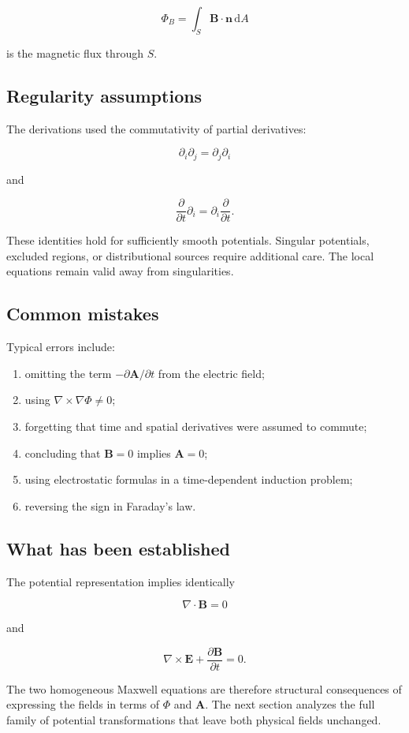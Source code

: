 \[
\Phi_B
=
\int_S
\mathbf{B}\cdot\mathbf{n}
\,\mathrm{d}A
\]

is the magnetic flux through \(S\).

\subsection{Regularity assumptions}

The derivations used the commutativity of partial derivatives:

\[
\partial_i\partial_j
=
\partial_j\partial_i
\]

and

\[
\frac{\partial}{\partial t}
\partial_i
=
\partial_i
\frac{\partial}{\partial t}.
\]

These identities hold for sufficiently smooth potentials. Singular potentials, excluded regions, or distributional sources require additional care. The local equations remain valid away from singularities.

\subsection{Common mistakes}

Typical errors include:

\begin{enumerate}
    \item omitting the term \(-\partial\mathbf{A}/\partial t\) from the electric field;
    \item using \(\nabla\times\nabla\Phi\neq0\);
    \item forgetting that time and spatial derivatives were assumed to commute;
    \item concluding that \(\mathbf{B}=0\) implies \(\mathbf{A}=0\);
    \item using electrostatic formulas in a time-dependent induction problem;
    \item reversing the sign in Faraday's law.
\end{enumerate}

\subsection{What has been established}

The potential representation implies identically

\[
\nabla\cdot\mathbf{B}=0
\]

and

\[
\nabla\times\mathbf{E}
+
\frac{\partial\mathbf{B}}{\partial t}=0.
\]

The two homogeneous Maxwell equations are therefore structural consequences of expressing the fields in terms of \(\Phi\) and \(\mathbf{A}\). The next section analyzes the full family of potential transformations that leave both physical fields unchanged.
